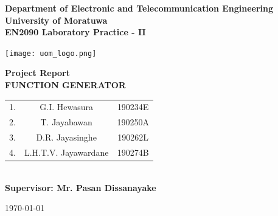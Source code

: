 \documentclass[11pt]{article}
\begin{document}
\begin{center}
\textbf{Department of Electronic and Telecommunication Engineering\\[10 pt]University of Moratuwa \\[20 pt] EN2090  Laboratory Practice - II \\[20 pt]}

\texttt{[image: uom\_logo.png]}

\begin{huge}
\vspace{30mm}
\textbf{Project Report \\[20 pt] FUNCTION GENERATOR} \\[100 pt]
\end{huge}

\begin{tabular}{c c c }
1. & G.I. Hewasura & 190234E  \\
2. & T. Jayabawan  & 190250A  \\ 
3. & D.R. Jayasinghe & 190262L  \\  
4. & L.H.T.V. Jayawardane & 190274B
\end{tabular}

\textbf{\\[20 pt]Supervisor: Mr. Pasan Dissanayake\\[10 pt]}

\begin{large}
\today
\end{large}

\end{center}
\thispagestyle{empty} 
\newpage
\end{document}
